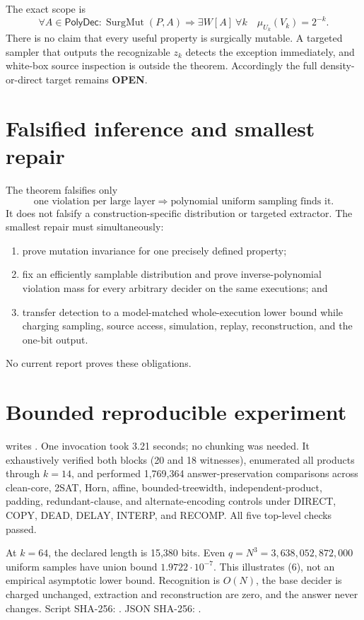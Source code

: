 \documentclass[11pt]{article}
\newcommand{\OPEN}{\textbf{OPEN}}
\begin{document}
The exact scope is
\[
\forall A\in\mathsf{PolyDec}:
 \operatorname{SurgMut}(P,A)\Rightarrow
 \exists W[A]\ \forall k\quad \mu_{U_k}(V_k)=2^{-k}.       \tag{7}
\]
There is no claim that every useful property is surgically mutable. A targeted
sampler that outputs the recognizable \(z_k\) detects the exception
immediately, and white-box source inspection is outside the theorem.
Accordingly the full density-or-direct target remains \OPEN.

\section{Falsified inference and smallest repair}
The theorem falsifies only
\[
 \text{one violation per large layer}
 \Longrightarrow
 \text{polynomial uniform sampling finds it}.             \tag{8}
\]
It does not falsify a construction-specific distribution or targeted
extractor. The smallest repair must simultaneously:
\begin{enumerate}
\item prove mutation invariance for one precisely defined property;
\item fix an efficiently samplable distribution and prove inverse-polynomial
violation mass for every arbitrary decider on the same executions; and
\item transfer detection to a model-matched whole-execution lower bound while
charging sampling, source access, simulation, replay, reconstruction, and the
one-bit output.
\end{enumerate}
No current report proves these obligations.

\section{Bounded reproducible experiment}
 writes
.
One invocation took 3.21 seconds; no chunking was needed. It exhaustively
verified both blocks (20 and 18 witnesses), enumerated all products through
\(k=14\), and performed 1,769,364 answer-preservation comparisons across
clean-core, 2SAT, Horn, affine, bounded-treewidth, independent-product,
padding, redundant-clause, and alternate-encoding controls under DIRECT,
COPY, DEAD, DELAY, INTERP, and RECOMP. All five top-level checks passed.

At \(k=64\), the declared length is 15,380 bits. Even
\(q=N^3=3{,}638{,}052{,}872{,}000\) uniform samples have union bound
\(1.9722\cdot10^{-7}\). This illustrates (6), not an empirical asymptotic
lower bound. Recognition is \(O(N)\), the base decider is charged unchanged,
extraction and reconstruction are zero, and the answer never changes.
Script SHA-256:
.
JSON SHA-256:
.
\end{document}
